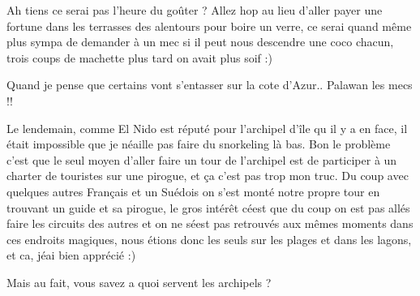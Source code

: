 \begin{multicols}{2}
Ah tiens ce serai pas l'heure du goûter ? Allez hop au lieu d'aller payer une fortune dans les terrasses des alentours pour boire un verre, ce serai quand même plus sympa de demander à un mec si il peut nous descendre une coco chacun, trois coups de machette plus tard on avait plus soif :)


Quand je pense que certains vont s'entasser sur la cote d'Azur.. Palawan les mecs !!


Le lendemain, comme El Nido est réputé pour l'archipel d'île qu il y a en face, il était impossible que je néaille pas faire du snorkeling là bas. Bon le problème c'est que le seul moyen d'aller faire un tour de l'archipel est de participer à un charter de touristes sur une pirogue, et ça c'est pas trop mon truc. Du coup avec quelques autres Français et un Suédois on s'est monté notre propre tour en trouvant un guide et sa pirogue, le gros intérêt céest que du coup on est pas allés faire les circuits des autres et on ne séest pas retrouvés aux mêmes moments dans ces endroits magiques, nous étions donc les seuls sur les plages et dans les lagons, et ca, jéai bien apprécié :)


Mais au fait, vous savez a quoi servent les archipels ?

\end{multicols}


